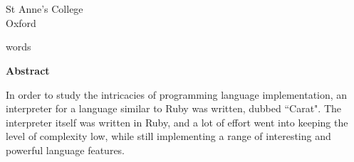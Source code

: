 \begin{titlepage}
\begin{center}

  {\GaramondClassicoSC {\huge \textbf{\gettitle}}} \\
  \bigskip
  {\Large
    \textbf{\getauthor} \\
    St Anne's College \\
    Oxford}\\
  \bigskip
  {\large \getdate}
  
	 words
	
	\vspace{1.5cm}
	
	{\Large \textbf{Abstract}}\\
  \parbox{10cm}{
  \bigskip
  In order to study the intricacies of programming language implementation, an interpreter for a 
  language similar to Ruby was written, dubbed ``Carat". The interpreter itself was written in
  Ruby, and a lot of effort went into keeping the level of complexity low, while still implementing
  a range of interesting and powerful language features.
  }

\end{center}
\end{titlepage}
